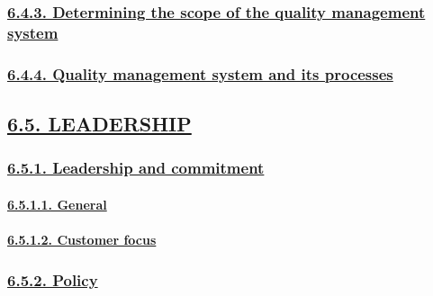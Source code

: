 \documentclass[
]{article}
\begin{document}
\hypertarget{determining-the-scope-of-the-quality-management-system}{%
\subsubsection{\texorpdfstring{\protect\hyperlink{determining-the-scope-of-the-quality-management-system-1}{6.4.3.
Determining the scope of the quality management
system}}{6.4.3. Determining the scope of the quality management system}}\label{determining-the-scope-of-the-quality-management-system}}

\hypertarget{quality-management-system-and-its-processes}{%
\subsubsection{\texorpdfstring{\protect\hyperlink{quality-management-system-and-its-processes-1}{6.4.4.
Quality management system and its
processes}}{6.4.4. Quality management system and its processes}}\label{quality-management-system-and-its-processes}}

\hypertarget{leadership}{%
\subsection{\texorpdfstring{\protect\hyperlink{leadership-1}{6.5.
LEADERSHIP}}{6.5. LEADERSHIP}}\label{leadership}}

\hypertarget{leadership-and-commitment}{%
\subsubsection{\texorpdfstring{\protect\hyperlink{leadership-and-commitment-1}{6.5.1.
Leadership and
commitment}}{6.5.1. Leadership and commitment}}\label{leadership-and-commitment}}

\hypertarget{general}{%
\paragraph{\texorpdfstring{\protect\hyperlink{general-9}{6.5.1.1.
General}}{6.5.1.1. General}}\label{general}}

\hypertarget{customer-focus}{%
\paragraph{\texorpdfstring{\protect\hyperlink{customer-focus-1}{6.5.1.2.
Customer focus}}{6.5.1.2. Customer focus}}\label{customer-focus}}

\hypertarget{policy}{%
\subsubsection{\texorpdfstring{\protect\hyperlink{policy-1}{6.5.2.
Policy}}{6.5.2. Policy}}\label{policy}}
\end{document}
